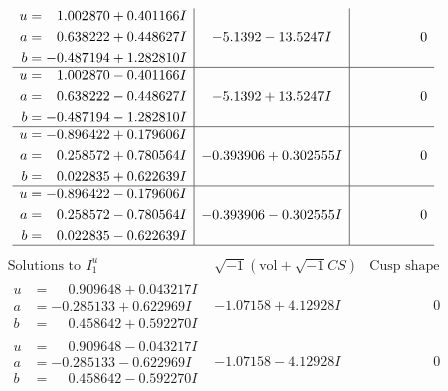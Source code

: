 \documentclass[1p]{elsarticle_modified}
\theoremstyle{definition}
\newcommand{\I}{\sqrt{-1}}
\begin{document}
$$\begin{array}{c|c|c}
\begin{aligned}
u &= \phantom{-}1.002870 + 0.401166 I \\
a &= \phantom{-}0.638222 + 0.448627 I \\
b &= -0.487194 + 1.282810 I\end{aligned}
 & -5.1392 - 13.5247 I & \phantom{-0.000000 } 0 \\ \hline\begin{aligned}
u &= \phantom{-}1.002870 - 0.401166 I \\
a &= \phantom{-}0.638222 - 0.448627 I \\
b &= -0.487194 - 1.282810 I\end{aligned}
 & -5.1392 + 13.5247 I & \phantom{-0.000000 } 0 \\ \hline\begin{aligned}
u &= -0.896422 + 0.179606 I \\
a &= \phantom{-}0.258572 + 0.780564 I \\
b &= \phantom{-}0.022835 + 0.622639 I\end{aligned}
 & -0.393906 + 0.302555 I & \phantom{-0.000000 } 0 \\ \hline\begin{aligned}
u &= -0.896422 - 0.179606 I \\
a &= \phantom{-}0.258572 - 0.780564 I \\
b &= \phantom{-}0.022835 - 0.622639 I\end{aligned}
 & -0.393906 - 0.302555 I & \phantom{-0.000000 } 0\\
 \hline 
 \end{array}$$\newpage$$\begin{array}{c|c|c}  
\text{Solutions to }I^u_{1}& \I (\text{vol} + \sqrt{-1}CS) & \text{Cusp shape}\\
 \hline 
\begin{aligned}
u &= \phantom{-}0.909648 + 0.043217 I \\
a &= -0.285133 + 0.622969 I \\
b &= \phantom{-}0.458642 + 0.592270 I\end{aligned}
 & -1.07158 + 4.12928 I & \phantom{-0.000000 } 0 \\ \hline\begin{aligned}
u &= \phantom{-}0.909648 - 0.043217 I \\
a &= -0.285133 - 0.622969 I \\
b &= \phantom{-}0.458642 - 0.592270 I\end{aligned}
 & -1.07158 - 4.12928 I & \phantom{-0.000000 } 0 \\ \hline\begin{aligned}

\end{aligned}
\end{array}$$
\end{document}
